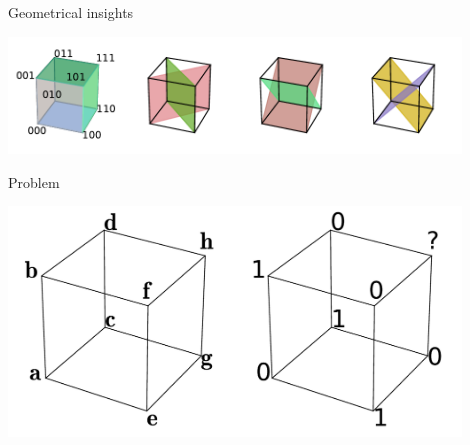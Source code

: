 \documentclass{beamer}
\begin{document}
\begin{frame}{Geometrical insights}
  \begin{center}
    \includegraphics[width=0.9\textwidth]{figures/cubes_in_B3.pdf}
  \end{center}
\end{frame}

\begin{frame}{Problem}
  \begin{center}
    \includegraphics[width=0.9\textwidth]{figures/classification_problem.pdf}
  \end{center}
\end{frame}
\end{document}
